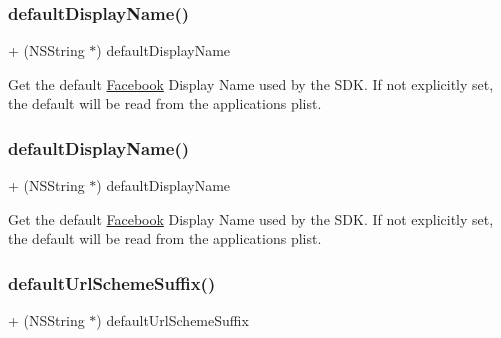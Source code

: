 \subsubsection{\texorpdfstring{default\+Display\+Name()}{defaultDisplayName()}\hspace{0.1cm}{\footnotesize\ttfamily [4/5]}}
{\footnotesize\ttfamily + (N\+S\+String $\ast$) default\+Display\+Name \begin{DoxyParamCaption}{ }\end{DoxyParamCaption}}

Get the default \hyperlink{interfaceFacebook}{Facebook} Display Name used by the S\+DK. If not explicitly set, the default will be read from the application\textquotesingle{}s plist. \mbox{\label{interfaceFBSettings_a64b1fe4c26086a1a2bb5b162815f2786}} 
\subsubsection{\texorpdfstring{default\+Display\+Name()}{defaultDisplayName()}\hspace{0.1cm}{\footnotesize\ttfamily [5/5]}}
{\footnotesize\ttfamily + (N\+S\+String $\ast$) default\+Display\+Name \begin{DoxyParamCaption}{ }\end{DoxyParamCaption}}

Get the default \hyperlink{interfaceFacebook}{Facebook} Display Name used by the S\+DK. If not explicitly set, the default will be read from the application\textquotesingle{}s plist. \mbox{\label{interfaceFBSettings_ae7709bddfea2d7cf28ad5e91f769dc9b}} 
\subsubsection{\texorpdfstring{default\+Url\+Scheme\+Suffix()}{defaultUrlSchemeSuffix()}\hspace{0.1cm}{\footnotesize\ttfamily [1/5]}}
{\footnotesize\ttfamily + (N\+S\+String $\ast$) default\+Url\+Scheme\+Suffix \begin{DoxyParamCaption}{ }\end{DoxyParamCaption}}

